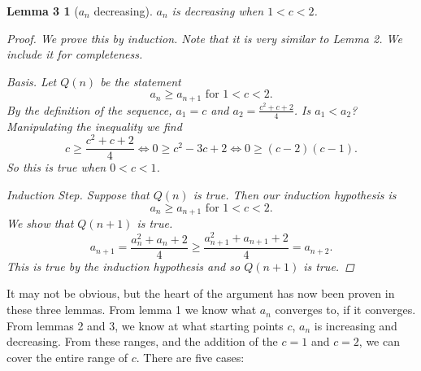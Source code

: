 \documentclass[12pt,letterpaper]{article}
\newtheorem*{lemma3}{Lemma 3}
\begin{document}
\begin{lemma3}[$a_n$ decreasing]
$a_n$ is decreasing when $1 < c < 2$.
\begin{proof}
We prove this by induction. Note that it is \emph{very} similar to Lemma 2. We include it for completeness.

\emph{Basis.} Let $Q(n)$ be the statement 
\[
a_n \geq a_{n+1} \mbox{ for } 1 < c < 2.
\]
By the definition of the sequence, $a_1 = c$ and $a_2= \frac{c^2+c+2}{4}$. Is $a_1 < a_2$? Manipulating the inequality we find
\[ 
c \geq \frac{c^2+c+2}{4} \iff 0 \geq c^2-3c+2 \iff 0 \geq (c-2)(c-1).
\]
So this is true when $0 < c < 1$.

\emph{Induction Step.} Suppose that $Q(n)$ is true. Then our induction hypothesis is
\[
a_n \geq a_{n+1} \mbox{ for } 1 < c < 2.
\]
We show that $Q(n+1)$ is true.
\[
a_{n+1} = \frac{a_n^2+a_n+2}{4} \geq \frac{a_{n+1}^2+a_{n+1}+2}{4} = a_{n+2}.
\]
This is true by the induction hypothesis and so $Q(n+1)$ is true.
\end{proof}
\end{lemma3}

It may not be obvious, but the heart of the argument has now been proven in these three lemmas. From lemma 1 we know what $a_n$ converges to, if it converges. From lemmas 2 and 3, we know at what starting points $c$, $a_n$ is increasing and decreasing. From these ranges, and the addition of the $c=1$ and $c=2$, we can cover the entire range of $c$. There are five cases:
\end{document}
